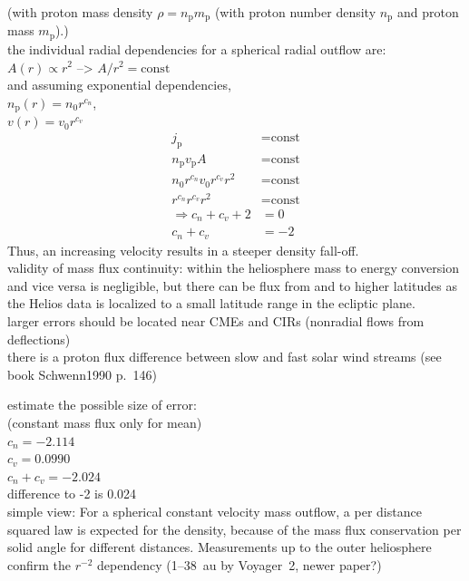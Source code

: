(with proton mass density $\rho = n_\text{p} m_\text{p}$ (with proton number density $n_\text{p}$ and proton mass $m_\text{p}$).)\\

the individual radial dependencies for a spherical radial outflow are:\\
$A(r) \propto r^2$ --> $A/r^2 = \text{const}$\\
and assuming exponential dependencies,\\
$n_{\text{p}}(r) = n_0 r^{c_n}$,\\
$v(r) = v_0 r^{c_v}$\\
\begin{align}
	j_\text{p} &= \text{const}\\
	n_\text{p} v_\text{p} A &= \text{const}\\
	n_0 r^{c_n} v_0 r^{c_v} r^2 &= \text{const}\\
	r^{c_n} r^{c_v} r^2 &= \text{const}\\
	\Rightarrow c_n + c_v + 2 &= 0\\
	c_n + c_v &= -2
\end{align}
Thus, an increasing velocity results in a steeper density fall-off.\\

validity of mass flux continuity: within the heliosphere mass to energy conversion and vice versa is negligible, but there can be flux from and to higher latitudes as the Helios data is localized to a small latitude range in the ecliptic plane.\\
larger errors should be located near CMEs and CIRs (nonradial flows from deflections)\\
there is a proton flux difference between slow and fast solar wind streams (see book Schwenn1990 p.~146)

estimate the possible size of error:\\
(constant mass flux only for mean)\\
$c_n = -2.114$\\
$c_v = 0.0990$\\
$c_n + c_v = -2.024$\\
difference to -2 is 0.024\\

simple view: For a spherical constant velocity mass outflow, a per distance squared law is expected for the density, because of the mass flux conservation per solid angle for different distances. Measurements up to the outer heliosphere confirm the $r^{-2}$ dependency (1--38~au by Voyager~2, \citep{Belcher1993} newer paper?)\\


